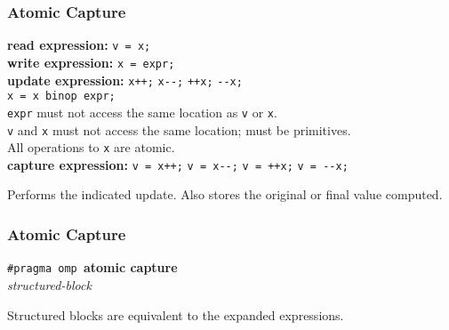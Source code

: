 \documentclass[aspectratio=43]{beamer}
\newenvironment{changemargin}[1]{%
  \begin{list}{}{%
    \setlength{\topsep}{0pt}%
    \setlength{\leftmargin}{#1}%
    \setlength{\rightmargin}{1em}
    \setlength{\listparindent}{\parindent}%
    \setlength{\itemindent}{\parindent}%
    \setlength{\parsep}{\parskip}%
  }%
  \item[]}{\end{list}}
\begin{document}
\begin{frame}[fragile]
  \frametitle{Atomic Capture}

  \begin{changemargin}{1cm}

  {\bf read expression:} {\tt v = x;}\\[1em]
  
  {\bf write expression:} {\tt x = expr;}\\[1em]

  {\bf update expression:} {\tt x++;} {\tt x{-}-;} {\tt ++x;} {\tt -{-}x;}\\
  \hspace{9em}{\tt x binop= expr;} {\tt x = x binop expr;}\\[1em]

    {\tt expr} must not access the same location as {\tt v} or {\tt x}.\\
    {\tt v} and {\tt x} must not access the same location; must be
      primitives.\\
    All operations to {\tt x} are atomic.\\[2em]

  {\bf capture expression:} {\tt v = x++;} {\tt v = x{-}-;} {\tt v = ++x;}
  {\tt v = -{-}x;}\\ \hspace{9.2em}{\tt v = x binop= expr;}

  Performs the indicated update. Also stores the original or
  final value computed.
  \end{changemargin}

\end{frame}

\begin{frame}[fragile]
  \frametitle{Atomic Capture}

  \begin{changemargin}{1cm}
  \begin{center}
    {\tt \#pragma omp }{\bf atomic capture}\\
    {\it structured-block}
  \end{center}

    Structured blocks are equivalent to the expanded expressions.
  \end{changemargin}

\end{frame}
\end{document}
